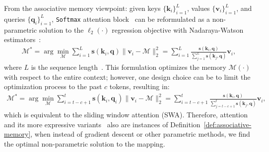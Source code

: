 \documentclass{article}
\newcommand{\vv}{\mathbf{v}}
\newcommand{\citep}{\parencite}
\newcommand{\M}[0]{\mathcal{M}}
\newcommand{\head}[1]{\vspace{1.7mm}\noindent{{\textcolor{c4}{\bf #1.}}}}
\newcommand{\vk}{\boldsymbol{k}}
\newcommand{\vq}{\boldsymbol{q}}
\renewcommand{\vv}{\boldsymbol{v}}
\begin{document}
{\head{Softmax Attention} From the associative memory viewpoint: given keys $\{\vk_i\}_{i=1}^{L}$, values $\{\vv_i\}_{i=1}^{L}$, and queries $\{\vq_i\}_{i=1}^{L}$, \texttt{Softmax} attention block~\citep{bahdanau2014neural, transformers} can be reformulated as a non-parametric  solution to the $\ell_2(\cdot)$ regression objective with  Nadaraya-Watson estimators~\citep{zhang2022analysis, fan2018local}:
\begin{align}\label{eq:attention-nadaraya}
    \M^* = \arg\min_{\M} \sum_{i = 1}^{L} \mathbf{s}(\vk_i, \vq) \|\vv_i - \M \|^2_2
    = \sum_{i = 1}^{L} \frac{\mathbf{s}(\vk_i, \vq)}{\sum_{j = 1}^{L} \mathbf{s}(\vk_j, \vq)} \vv_i,
\end{align}
where $L$ is the sequence length~\citep{sun2024learning}. This formulation optimizes the memory $\M(\cdot)$ with respect to the entire context; however, one design choice can be to limit the optimization process to the past $c$ tokens, resulting in:
\begin{align}
    \M^* = \arg\min_{\M} \sum_{i = t - c + 1}^{t} \mathbf{s}(\vk_i, \vq_i) \|\vv_i - \M \|^2_2  = \sum_{i = t-c + 1}^{t} \frac{\mathbf{s}(\vk_i, \vq)}{\sum_{j = t - c + 1}^{t} \mathbf{s}(\vk_j, \vq)} \vv_i, 
\end{align}
which is equivalent to the sliding window attention (SWA). Therefore, attention and its more expressive variants~\citep{wang2025test} also are instances of Definition~\ref{def:associative-memory}, when instead of gradient descent or other parametric methods, we find the optimal non-parametric solution to the mapping. 

}
\end{document}
